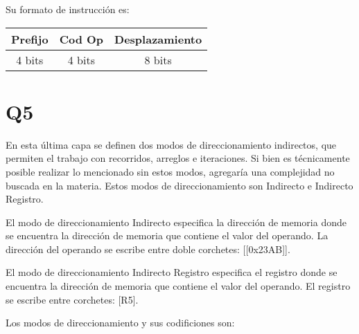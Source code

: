 \begin{threeparttable}
\begin{threeparttable}
Su formato de instrucción es:
\begin{table}[H]
  \label{tab:formatoinstruccion}
  \begin{center}
    \begin{tabular}{| c | c | c |}
      \hline
      \textbf{Prefijo} & \textbf{Cod Op} & \textbf{Desplazamiento} \\ \hline
      4 bits           & 4 bits           & 8 bits                 \\ \hline
    \end{tabular}
  \end{center}
\end{table}

\section{Q5}
En esta última capa se definen dos modos de direccionamiento indirectos, que permiten el trabajo con recorridos, arreglos e iteraciones. Si bien es técnicamente posible realizar lo mencionado sin estos modos, agregaría una complejidad no buscada en la materia.
Estos modos de direccionamiento son Indirecto e Indirecto Registro. 

El modo de direccionamiento Indirecto especifica la dirección de memoria donde se encuentra la dirección de memoria que contiene el valor del operando. La dirección del 
  operando se escribe entre doble corchetes: [[0x23AB]].

El modo de direccionamiento Indirecto Registro especifica el registro donde se encuentra la dirección de memoria que contiene el valor del operando. El registro se escribe entre corchetes: [R5].

Los modos de direccionamiento y sus codificiones son:
\end{threeparttable}
\end{threeparttable}
